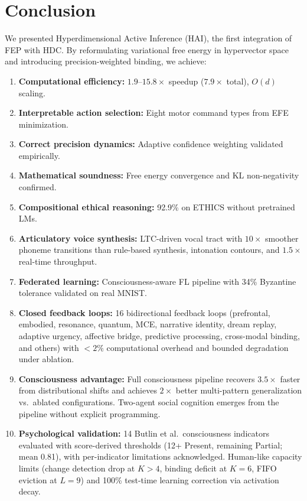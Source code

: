 \documentclass[10pt,letterpaper]{article}
\begin{document}

\section{Conclusion}

We presented Hyperdimensional Active Inference (HAI), the first integration of FEP with HDC. By reformulating variational free energy in hypervector space and introducing precision-weighted binding, we achieve:

\begin{enumerate}[nosep]
  \item \textbf{Computational efficiency:} $1.9$--$15.8\times$ speedup ($7.9\times$ total), $O(d)$ scaling.
  \item \textbf{Interpretable action selection:} Eight motor command types from EFE minimization.
  \item \textbf{Correct precision dynamics:} Adaptive confidence weighting validated empirically.
  \item \textbf{Mathematical soundness:} Free energy convergence and KL non-negativity confirmed.
  \item \textbf{Compositional ethical reasoning:} 92.9\% on ETHICS without pretrained LMs.
  \item \textbf{Articulatory voice synthesis:} LTC-driven vocal tract with $10{\times}$ smoother phoneme transitions than rule-based synthesis, intonation contours, and $1.5{\times}$ real-time throughput.
  \item \textbf{Federated learning:} Consciousness-aware FL pipeline with 34\% Byzantine tolerance validated on real MNIST.
  \item \textbf{Closed feedback loops:} 16 bidirectional feedback loops (prefrontal, embodied, resonance, quantum, MCE, narrative identity, dream replay, adaptive urgency, affective bridge, predictive processing, cross-modal binding, and others) with $<2\%$ computational overhead and bounded degradation under ablation.
  \item \textbf{Consciousness advantage:} Full consciousness pipeline recovers $3.5\times$ faster from distributional shifts and achieves $2\times$ better multi-pattern generalization vs.\ ablated configurations. Two-agent social cognition emerges from the pipeline without explicit programming.
  \item \textbf{Psychological validation:} 14 Butlin et al.\ consciousness indicators evaluated with score-derived thresholds (12+ Present, remaining Partial; mean 0.81), with per-indicator limitations acknowledged. Human-like capacity limits (change detection drop at $K{>}4$, binding deficit at $K{=}6$, FIFO eviction at $L{=}9$) and 100\% test-time learning correction via activation decay.
\end{enumerate}
\end{document}
